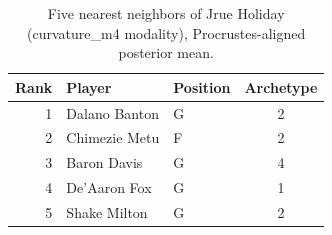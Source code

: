 \begin{table}[htbp]
  \centering\small
  \begin{tabular}{rllc}
    \toprule
    Rank & Player & Position & Archetype \\
    \midrule
    1 & Dalano Banton & G & 2 \\
    2 & Chimezie Metu & F & 2 \\
    3 & Baron Davis & G & 4 \\
    4 & De'Aaron Fox & G & 1 \\
    5 & Shake Milton & G & 2 \\
    \bottomrule
  \end{tabular}
  \caption{Five nearest neighbors of Jrue Holiday (curvature_m4 modality), Procrustes-aligned posterior mean.}
  \label{tab:Jrue_Holiday_neighbors_curvature_m4}
\end{table}

